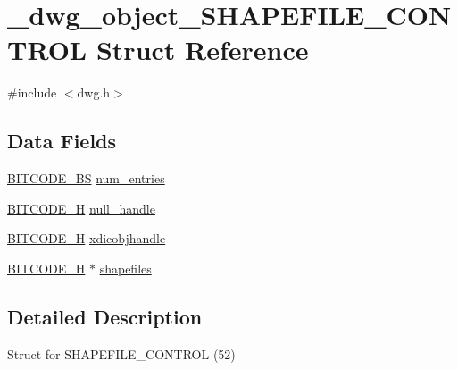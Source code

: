 \hypertarget{struct__dwg__object__SHAPEFILE__CONTROL}{\section{\-\_\-dwg\-\_\-object\-\_\-\-S\-H\-A\-P\-E\-F\-I\-L\-E\-\_\-\-C\-O\-N\-T\-R\-O\-L \-Struct \-Reference}
\label{struct__dwg__object__SHAPEFILE__CONTROL}
}


{\ttfamily \#include $<$dwg.\-h$>$}

\subsection*{\-Data \-Fields}
\begin{DoxyCompactItemize}
\item 
\hyperlink{dwg_8h_a94297606fbd4a4ff97e8add284af0809}{\-B\-I\-T\-C\-O\-D\-E\-\_\-\-B\-S} \hyperlink{struct__dwg__object__SHAPEFILE__CONTROL_aaef76f0c4944cfd50dce75963cff03d1}{num\-\_\-entries}
\item 
\hyperlink{dwg_8h_a7c700e94e047a97ba8c24bdfe4029dc3}{\-B\-I\-T\-C\-O\-D\-E\-\_\-\-H} \hyperlink{struct__dwg__object__SHAPEFILE__CONTROL_a9d31c9e7861fb2352bd5606c1251ab41}{null\-\_\-handle}
\item 
\hyperlink{dwg_8h_a7c700e94e047a97ba8c24bdfe4029dc3}{\-B\-I\-T\-C\-O\-D\-E\-\_\-\-H} \hyperlink{struct__dwg__object__SHAPEFILE__CONTROL_a323f4f8d1ecb1f130defd0c2285fff62}{xdicobjhandle}
\item 
\hyperlink{dwg_8h_a7c700e94e047a97ba8c24bdfe4029dc3}{\-B\-I\-T\-C\-O\-D\-E\-\_\-\-H} $\ast$ \hyperlink{struct__dwg__object__SHAPEFILE__CONTROL_a8572327308d064a76e9df51de981dd53}{shapefiles}
\end{DoxyCompactItemize}


\subsection{\-Detailed \-Description}
\-Struct for \-S\-H\-A\-P\-E\-F\-I\-L\-E\-\_\-\-C\-O\-N\-T\-R\-O\-L (52) 

